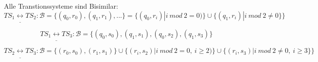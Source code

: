 Alle Transtionssysteme sind Bisimilar:
\[TS_1 \underline{\leftrightarrow} TS_2: \mathcal{B}=\{(q_0,r_0),(q_1,r_1),...\}=\{(q_0,r_i)|i\  mod\  2 =0)\}\cup \{(q_1,r_i)|i\  mod\  2 \not = 0 \}\} \]

\[TS_1 \underline{\leftrightarrow} TS_3: \mathcal{B}=\{
(q_0,s_0),(q_1,s_1),(q_0,s_2),(q_1,s_3)\} \]

\[TS_2 \underline{\leftrightarrow} TS_3: \mathcal{B}=\{(r_0,s_0),(r_1,s_1)\}\cup \{(r_i,s_2)|i\  mod\  2 =0,\ i\geq 2)\}\cup \{(r_i,s_3)|i\  mod\  2 \not = 0,\ i\geq 3 \}\} \]
